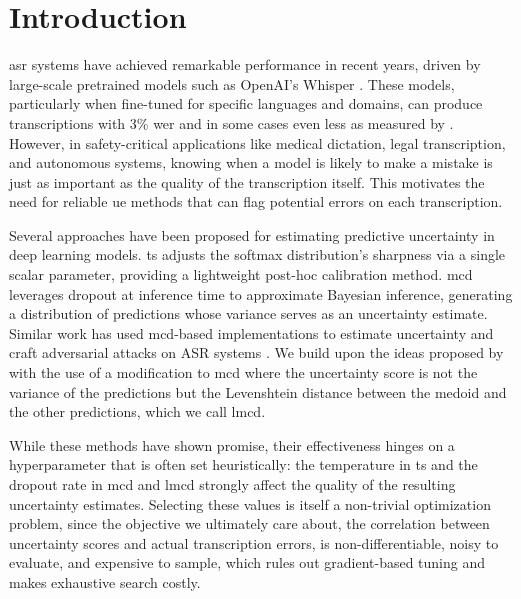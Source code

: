 \documentclass[runningheads]{llncs}
\begin{document}
\section{Introduction}

\acrfull{asr} systems have achieved remarkable performance in recent years, driven by large-scale pretrained models such as OpenAI's Whisper \cite{radford2023robust}. These models, particularly when fine-tuned for specific languages and domains, can produce transcriptions with 3\% \acrfull{wer} and in some cases even less as measured by \cite{srivastav2025open}. However, in safety-critical applications like medical dictation, legal transcription, and autonomous systems, knowing when a model is likely to make a mistake is just as important as the quality of the transcription itself\cite{koenecke2024careless}. This motivates the need for reliable \acrfull{ue} methods that can flag potential errors on each transcription.

Several approaches have been proposed for estimating predictive uncertainty in deep learning models. \acrfull{ts} \cite{guo2017calibration} adjusts the softmax distribution's sharpness via a single scalar parameter, providing a lightweight post-hoc calibration method. \acrfull{mcd} \cite{gal2016dropout} leverages dropout at inference time to approximate Bayesian inference, generating a distribution of predictions whose variance serves as an uncertainty estimate. Similar work has used \acrshort{mcd}-based implementations to estimate uncertainty and craft adversarial attacks on ASR systems \cite{jayashankar2020detecting}.
We build upon the ideas proposed by \cite{rodriguez2024uncertainty} with the use of a modification to \acrshort{mcd} where the uncertainty score is not the variance of the predictions but the Levenshtein distance between the medoid and the other predictions, which we call \acrfull{lmcd}.

While these methods have shown promise, their effectiveness hinges on a hyperparameter that is often set heuristically: the temperature in \acrshort{ts} and the dropout rate in \acrshort{mcd} and \acrshort{lmcd} strongly affect the quality of the resulting uncertainty estimates. Selecting these values is itself a non-trivial optimization problem, since the objective we ultimately care about, the correlation between uncertainty scores and actual transcription errors, is non-differentiable, noisy to evaluate, and expensive to sample, which rules out gradient-based tuning and makes exhaustive search costly.
\end{document}
